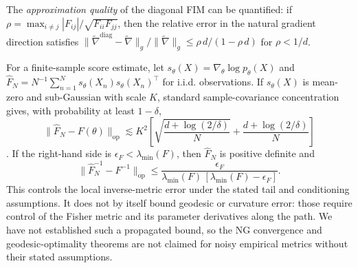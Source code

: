 \documentclass[a4paper,fleqn]{cas-dc}
\newcommand{\natgrad}{\widetilde{\nabla}}
\begin{document}
The \emph{approximation quality} of the diagonal FIM can be quantified:
if $\rho = \max_{i\neq j} |F_{ij}| / \sqrt{F_{ii}F_{jj}}$, then the
relative error in the natural gradient direction satisfies
$\|\natgrad^{\mathrm{diag}} - \natgrad\|_g / \|\natgrad\|_g \leq
\rho\,d / (1 - \rho\,d)$ for $\rho < 1/d$.

For a finite-sample score estimate, let
$s_\theta(X)=\nabla_\theta\log p_\theta(X)$ and
$\widehat F_N=N^{-1}\sum_{n=1}^N s_\theta(X_n)s_\theta(X_n)^\top$ for
i.i.d. observations. If $s_\theta(X)$ is mean-zero and sub-Gaussian with
scale $K$, standard sample-covariance concentration gives, with probability
at least $1-\delta$,
\[
\|\widehat F_N-F(\theta)\|_{\mathrm{op}}
\lesssim K^2\!\left[
\sqrt{\frac{d+\log(2/\delta)}{N}}
+\frac{d+\log(2/\delta)}{N}\right]
\]
\cite{vershynin2018highdimensional}. If the right-hand side is
$\epsilon_F<\lambda_{\min}(F)$, then $\widehat F_N$ is positive definite
and
\[
\|\widehat F_N^{-1}-F^{-1}\|_{\mathrm{op}}
\leq \frac{\epsilon_F}
{\lambda_{\min}(F)\,[\lambda_{\min}(F)-\epsilon_F]}.
\]
This controls the local inverse-metric error under the stated tail and
conditioning assumptions. It does not by itself bound geodesic or curvature
error: those require control of the Fisher metric and its parameter
derivatives along the path. We have not established such a propagated bound,
so the NG convergence and geodesic-optimality theorems are not claimed for
noisy empirical metrics without their stated assumptions.
\end{document}
